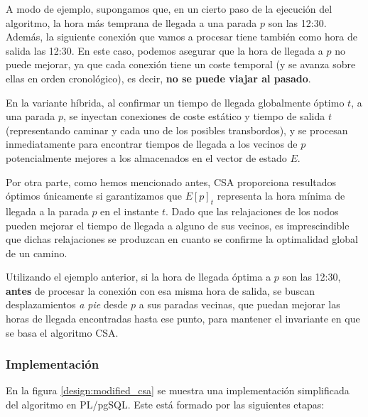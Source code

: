 A modo de ejemplo, supongamos que, en un cierto paso de la ejecución del algoritmo, la hora más temprana de llegada a una parada $p$ son las 12:30. Además, la siguiente conexión que vamos a procesar tiene también como hora de salida las 12:30. En este caso, podemos asegurar que la hora de llegada a $p$ no puede mejorar, ya que cada conexión tiene un coste temporal (y se avanza sobre ellas en orden cronológico), es decir, \textbf{no se puede viajar al pasado}.

En la variante híbrida, al confirmar un tiempo de llegada globalmente óptimo $t$, a una parada $p$, se inyectan conexiones de coste estático y tiempo de salida $t$ (representando caminar y cada uno de los posibles transbordos), y se procesan inmediatamente para encontrar tiempos de llegada a los vecinos de $p$ potencialmente mejores a los almacenados en el vector de estado $E$.

Por otra parte, como hemos mencionado antes, CSA proporciona resultados óptimos únicamente si garantizamos que $E[p]_t$ representa la hora mínima de llegada a la parada $p$ en el instante $t$. Dado que las relajaciones de los nodos pueden mejorar el tiempo de llegada a alguno de sus vecinos, es imprescindible que dichas relajaciones se produzcan en cuanto se confirme la optimalidad global de un camino.

Utilizando el ejemplo anterior, si la hora de llegada óptima a $p$ son las 12:30, \textbf{antes} de procesar la conexión con esa misma hora de salida, se buscan desplazamientos \textit{a pie} desde $p$ a sus paradas vecinas, que puedan mejorar las horas de llegada encontradas hasta ese punto, para mantener el invariante en que se basa el algoritmo CSA.

\subsubsection{Implementación}

En la figura \ref{design:modified_csa} se muestra una implementación simplificada del algoritmo en PL/pgSQL. Este está formado por las siguientes etapas:

